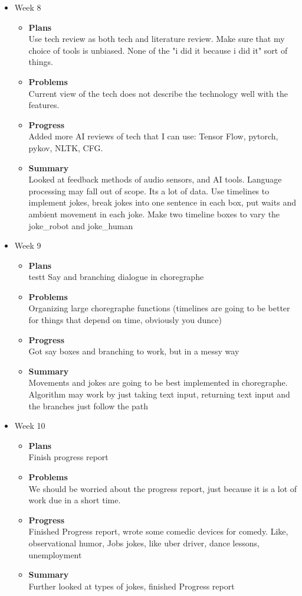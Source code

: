 \begin{itemize}
		\item{Week 8}
   			\begin{itemize}
				\item \textbf{Plans} \\
				Use tech review as both tech and literature review. Make sure that my choice of tools is unbiased. None of the "i did it because i did it" sort of things.
				\item \textbf{Problems} \\
				Current view of the tech does not describe the technology well with the features.
				\item \textbf{Progress} \\
				Added more AI reviews of tech that I can use:
				Tensor Flow, pytorch, pykov, NLTK, CFG.
				\item \textbf{Summary} \\
				Looked at feedback methods of audio sensors, and AI tools. Language processing may fall out of scope. Its a lot of data.
				Use timelines to implement jokes, break jokes into one sentence in each box, put waits and ambient movement in each joke. Make two timeline boxes to vary the joke_robot and joke_human 
			\end{itemize}
		\item{Week 9}
			\begin{itemize}
				\item \textbf{Plans} \\
			testt Say and branching dialogue in choregraphe 
				\item \textbf{Problems} \\
					Organizing large choregraphe functions (timelines are going to be better for things that depend on time, obviously you dunce) 			
				\item \textbf{Progress} \\
			Got say boxes and branching to work, but in a messy way	
				\item \textbf{Summary} \\
				Movements and jokes are going to be best implemented in choregraphe. Algorithm may work by just taking text input, returning text input and the branches just follow the path
			\end{itemize}
		\item{Week 10}
				\begin{itemize}
				\item \textbf{Plans} \\
				Finish progress report
				\item \textbf{Problems} \\
				We should be worried about the progress report, just because it is a lot of work due in a short time.
				\item \textbf{Progress} \\
				Finished Progress report, wrote some comedic devices for comedy. Like, observational humor, Jobs jokes, like uber driver, dance lessons, unemployment
				\item \textbf{Summary} \\
				Further looked at types of jokes, finished Progress report
			\end{itemize}
	\end{itemize}
